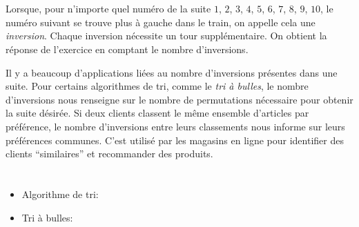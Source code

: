 {{%
\section*{\BrochureItsInformatics}
Lorsque, pour n’importe quel numéro de la suite $1$, $2$, $3$, $4$, $5$, $6$, $7$, $8$, $9$, $10$, le numéro suivant se trouve plus à gauche dans le train, on appelle cela une \emph{inversion}. Chaque inversion nécessite un tour supplémentaire. On obtient la réponse de l’exercice en comptant le nombre d’inversions.

Il y a beaucoup d’applications liées au nombre d’inversions présentes dans une suite. Pour certains algorithmes de tri, comme le \emph{tri à bulles}, le nombre d’inversions nous renseigne sur le nombre de permutations nécessaire pour obtenir la suite désirée. Si deux clients classent le même ensemble d’articles par préférence, le nombre d’inversions entre leurs classements nous informe sur leurs préférences communes. C’est utilisé par les magasins en ligne pour identifier des clients “similaires” et recommander des produits.



\section*{\BrochureWebsitesAndKeywords}
{\raggedright
\begin{itemize}
  \item Algorithme de tri: \href{https://fr.wikipedia.org/wiki/Algorithme_de_tri}{}
  \item Tri à bulles: \href{https://fr.wikipedia.org/wiki/Tri_\%C3\%A0_bulles}{}
\end{itemize}


}

}{}

\def\AuthorMukundM{} %
\def\AuthorDatzkoThutS{} %
\def\AuthorHieblerJ{} %
\def\AuthorAlharthiL{} %
\def\AuthorCesarD{} %
\def\AuthorNaughtonT{} %
\def\AuthorSchluterK{} %
\def\AuthorFutschekG{} %
\def\AuthorPelletE{} %

\newpage}{}
